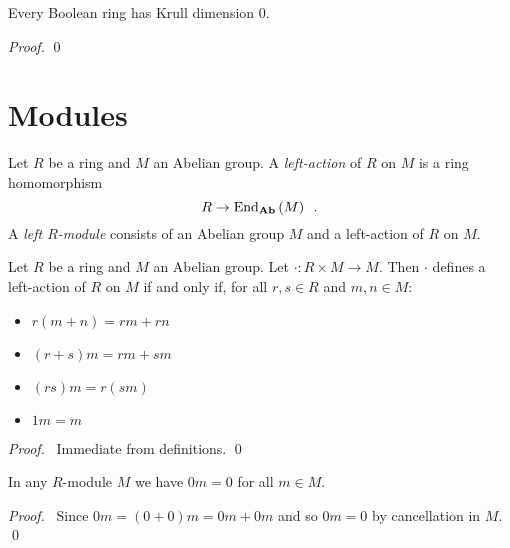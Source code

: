 \begin{prop}
Every Boolean ring has Krull dimension 0.
\end{prop}

\begin{proof}
\pf
{}
\qed
\end{proof}

\chapter{Modules}

\begin{df}
Let $R$ be a ring and $M$ an Abelian group. A \emph{left-action} of $R$ on $M$ is a ring homomorphism
\[ R \rightarrow \mathrm{End}_{\mathbf{Ab}} \left( {M} \right) \enspace . \]
A \emph{left $R$-module} consists of an Abelian group $M$ and a left-action of $R$ on $M$.
\end{df}

\begin{prop}
Let $R$ be a ring and $M$ an Abelian group. Let $\cdot : R \times M \rightarrow M$. Then $\cdot$ defines a left-action of $R$ on $M$ if and only if, for all $r,s \in R$ and $m,n \in M$:
\begin{itemize}
\item $r(m+n) = rm + rn$
\item $(r+s)m = rm + sm$
\item $(rs)m = r(sm)$
\item $1m = m$
\end{itemize}
\end{prop}

\begin{proof}
\pf\ Immediate from definitions. \qed
\end{proof}

\begin{prop}
In any $R$-module $M$ we have $0m= 0$ for all $m \in M$.
\end{prop}

\begin{proof}
\pf\ Since $0m = (0+0)m = 0m+0m$ and so $0m = 0$ by cancellation in $M$. \qed
\end{proof}

